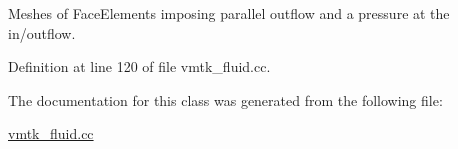 Meshes of Face\+Elements imposing parallel outflow and a pressure at the in/outflow. 



Definition at line 120 of file vmtk\+\_\+fluid.\+cc.



The documentation for this class was generated from the following file\+:\begin{DoxyCompactItemize}
\item 
\hyperlink{vmtk__fluid_8cc}{vmtk\+\_\+fluid.\+cc}\end{DoxyCompactItemize}
